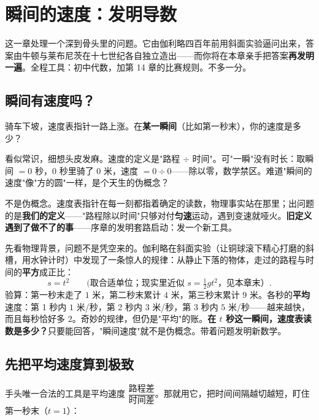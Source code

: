 \chapter{瞬间的速度：发明导数}

这一章处理一个深到骨头里的问题。它由伽利略四百年前用斜面实验逼问出来，答案由牛顿与莱布尼茨在十七世纪各自独立造出——而你将在本章亲手把答案\textbf{再发明一遍}。全程工具：初中代数，加第 14 章的比赛规则。不多一分。

\section{瞬间有速度吗？}

\begin{kaiwei}
骑车下坡，速度表指针一路上涨。在\textbf{某一瞬间}（比如第一秒末），你的速度是多少？
\end{kaiwei}

看似常识，细想头皮发麻。速度的定义是"路程 $\div$ 时间"。可"一瞬"没有时长：取瞬间 $= 0$ 秒，$0$ 秒里骑了 $0$ 米，速度 $= 0\div 0$——除以零，数学禁区。难道"瞬间的速度"像"方的圆"一样，是个天生的伪概念？

不是伪概念。速度表指针在每一刻都指着确定的读数，物理事实站在那里；出问题的是\textbf{我们的定义}——"路程除以时间"只够对付\textbf{匀速}运动，遇到变速就哑火。\textbf{旧定义遇到了做不了的事}——序章的发明套路启动：发一个新工具。

先看物理背景，问题不是凭空来的。伽利略在斜面实验（让铜球滚下精心打磨的斜槽，用水钟计时）中发现了一条惊人的规律：从静止下落的物体，走过的路程与时间的\textbf{平方}成正比：
\[
s = t^2 \qquad (\text{取合适单位；现实里近似 } s = \tfrac12 g t^2\text{，见本章末）}.
\]
验算：第一秒末走了 $1$ 米，第二秒末累计 $4$ 米，第三秒末累计 $9$ 米。各秒的\textbf{平均}速度：第 1 秒内 $1$ 米/秒，第 2 秒内 $3$ 米/秒，第 3 秒内 $5$ 米/秒——越来越快，而且每秒恰好多 $2$。奇妙的规律，但仍是"平均"的账。\textbf{在 $t$ 秒这一瞬间，速度表读数是多少？}只要能回答，"瞬间速度"就不是伪概念。带着问题发明新数学。

\section{先把平均速度算到极致}

手头唯一合法的工具是平均速度 $\dfrac{\text{路程差}}{\text{时间差}}$。那就用它，把时间间隔越切越短，盯住第一秒末（$t = 1$）：

